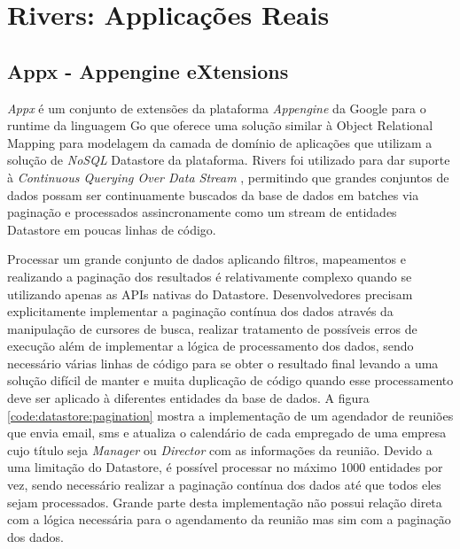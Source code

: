 \chapter{Rivers: Applicações Reais}
\label{cha:applications}

\section{Appx - Appengine eXtensions}
\label{sec:appx}

\emph{Appx} \cite{docs:drborges:appx} é um conjunto de extensões da plataforma \emph{Appengine} da Google \cite{docs:google:appengine} para o runtime da linguagem Go que oferece uma solução similar à Object Relational Mapping \cite{article:scott:orm} para modelagem da camada de domínio de aplicações que utilizam a solução de \emph{NoSQL} \cite{article:fowler:nosql} Datastore \cite{docs:google:datastore} da plataforma. Rivers foi utilizado para dar suporte à \emph{Continuous Querying Over Data Stream} \cite{paper:badu:continuous_querying}, permitindo que grandes conjuntos de dados possam ser continuamente buscados da base de dados em batches via paginação e processados assincronamente como um stream de entidades Datastore em poucas linhas de código.

Processar um grande conjunto de dados aplicando filtros, mapeamentos e realizando a paginação dos resultados é relativamente complexo quando se utilizando apenas as APIs nativas do Datastore. Desenvolvedores precisam explicitamente implementar a paginação contínua dos dados através da manipulação de cursores de busca, realizar tratamento de possíveis erros de execução além de implementar a lógica de processamento dos dados, sendo necessário várias linhas de código para se obter o resultado final levando a uma solução difícil de manter e muita duplicação de código quando esse processamento deve ser aplicado à diferentes entidades da base de dados. A figura \ref{code:datastore:pagination} mostra a implementação de um agendador de reuniões que envia email, sms e atualiza o calendário de cada empregado de uma empresa cujo título seja \emph{Manager} ou \emph{Director} com as informações da reunião. Devido a uma limitação do Datastore, é possível processar no máximo 1000 entidades por vez, sendo necessário realizar a paginação contínua dos dados até que todos eles sejam processados. Grande parte desta implementação não possui relação direta com a lógica necessária para o agendamento da reunião mas sim com a paginação dos dados.

